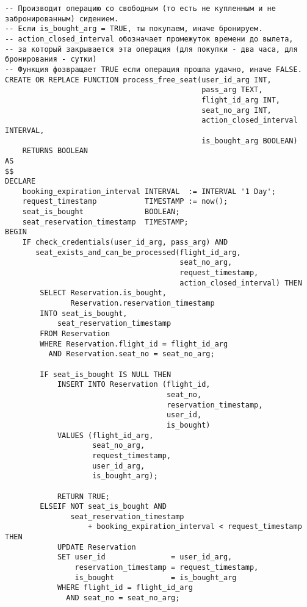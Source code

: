 \documentclass{article}
\begin{document}
\begin{verbatim}
-- Производит операцию со свободным (то есть не купленным и не забронированным) сидением.
-- Если is_bought_arg = TRUE, ты покупаем, иначе бронируем.
-- action_closed_interval обозначает промежуток времени до вылета,
-- за который закрывается эта операция (для покупки - два часа, для бронирования - сутки)
-- Функция фозвращает TRUE если операция прошла удачно, иначе FALSE.
CREATE OR REPLACE FUNCTION process_free_seat(user_id_arg INT,
                                             pass_arg TEXT,
                                             flight_id_arg INT,
                                             seat_no_arg INT,
                                             action_closed_interval INTERVAL,
                                             is_bought_arg BOOLEAN)
    RETURNS BOOLEAN
AS
$$
DECLARE
    booking_expiration_interval INTERVAL  := INTERVAL '1 Day';
    request_timestamp           TIMESTAMP := now();
    seat_is_bought              BOOLEAN;
    seat_reservation_timestamp  TIMESTAMP;
BEGIN
    IF check_credentials(user_id_arg, pass_arg) AND
       seat_exists_and_can_be_processed(flight_id_arg,
                                        seat_no_arg,
                                        request_timestamp,
                                        action_closed_interval) THEN
        SELECT Reservation.is_bought,
               Reservation.reservation_timestamp
        INTO seat_is_bought,
            seat_reservation_timestamp
        FROM Reservation
        WHERE Reservation.flight_id = flight_id_arg
          AND Reservation.seat_no = seat_no_arg;

        IF seat_is_bought IS NULL THEN
            INSERT INTO Reservation (flight_id,
                                     seat_no,
                                     reservation_timestamp,
                                     user_id,
                                     is_bought)
            VALUES (flight_id_arg,
                    seat_no_arg,
                    request_timestamp,
                    user_id_arg,
                    is_bought_arg);

            RETURN TRUE;
        ELSEIF NOT seat_is_bought AND
               seat_reservation_timestamp
                   + booking_expiration_interval < request_timestamp THEN
            UPDATE Reservation
            SET user_id               = user_id_arg,
                reservation_timestamp = request_timestamp,
                is_bought             = is_bought_arg
            WHERE flight_id = flight_id_arg
              AND seat_no = seat_no_arg;


\end{verbatim}
\end{document}
